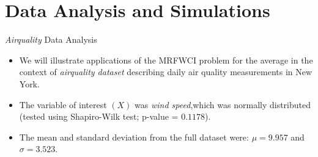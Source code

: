 \documentclass [xcolor=svgnames, t] {beamer}
\begin{document}
\section{Data Analysis and Simulations}
\begin{frame}{\textit{Airquality} Data Analysis}
  \vspace{5mm}
\begin{itemize}
\item We will illustrate applications of the MRFWCI problem for the average in the context of \textit{airquality dataset} 
describing daily air quality measurements in New York.
\item The variable of interest $(X)$ was \textit{wind speed},which
was normally distributed (tested using Shapiro-Wilk test; p-value = $0.1178$).
\item The mean and standard deviation from the full dataset were: $\mu = 9.957$ and $\sigma = 3.523$. 
\end{itemize}
\end{frame}
\end{document}
